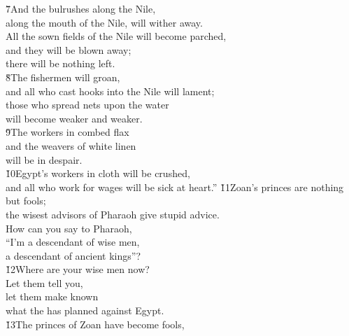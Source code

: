 \begin{poetry}
\poeml \v{7}And the bulrushes along the Nile, \\
\poemll    along the mouth of the Nile, will wither away. \\
\poeml All the sown fields of the Nile will become parched, \\
\poemll    and they will be blown away; \\
\poemlll       there will be nothing left. \\
\poeml \v{8}The fishermen will groan, \\
\poemll    and all who cast hooks into the Nile will lament; \\
\poeml those who spread nets upon the water \\
\poemll    will become weaker and weaker. \\
\poeml \v{9}The workers in combed flax \\
\poemll    and the weavers of white linen \\
\poemlll       will be in despair. \\
\poeml \v{10}Egypt's workers in cloth will be crushed, \\
\poemll    and all who work for wages will be sick at heart.''
\poeml \v{11}Zoan's princes are nothing but fools; \\
\poemll    the wisest advisors of Pharaoh give stupid advice. \\
\poeml How can you say to Pharaoh, \\
\poemll    ``I'm a descendant of wise men, \\
\poemlll       a descendant of ancient kings''? \\
\poeml \v{12}Where are your wise men now? \\
\poemll    Let them tell you, \\
\poeml let them make known \\
\poemll    what the  has planned against Egypt. \\
\poeml \v{13}The princes of Zoan have become fools, \\

\end{poetry}
